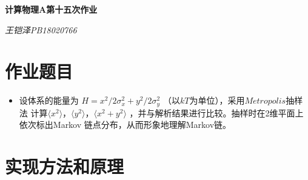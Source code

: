 \documentclass[UTF8]{ctexart}
\begin{document}
	\centering\textbf{\LARGE{计算物理A第十五次作业}}
	
	\textit{王铠泽\qquad PB18020766}
	
		
	\section{作业题目}
	
	\begin{itemize}
	\item	设体系的能量为 $H=x^2/2\sigma_x^2+y^2/2\sigma_y^2$
	（以$ kT $为单位），采用$ Metropolis $抽样法
	计算$\langle x^2 \rangle$，$\langle y^2 \rangle$，$\langle x^2+y^2 \rangle$
	，并与解析结果进行比较。抽样时在2维平面上依次标出Markov
	链点分布，从而形象地理解Markov链。
	\end{itemize}

	\section{实现方法和原理}
	
\end{document}
